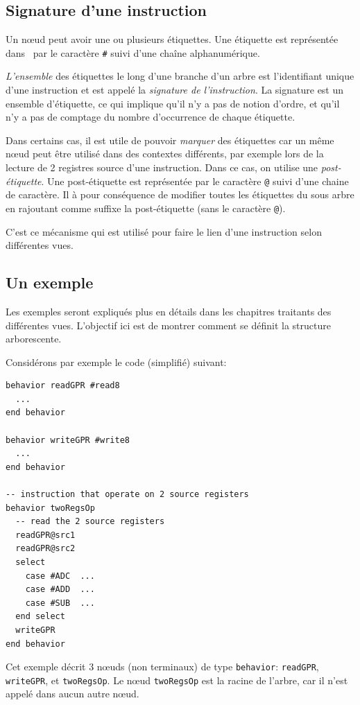 \subsection{Signature d'une instruction}
\label{sec:signature}
Un n\oe ud peut avoir une ou plusieurs étiquettes. Une étiquette est représentée dans \harmless\ par le caractère \texttt{\#} suivi d'une chaîne alphanumérique. 

\emph{L'ensemble} des étiquettes le long d'une branche d'un arbre est l'identifiant unique d'une instruction et est appelé la \emph{signature de l'instruction}. La signature est un ensemble d'étiquette, ce qui implique qu'il n'y a pas de notion d'ordre, et qu'il n'y a pas de comptage du nombre d'occurrence de chaque étiquette.

Dans certains cas, il est utile de pouvoir \emph{marquer} des étiquettes car un même n\oe ud peut être utilisé dans des contextes différents, par exemple lors de la lecture de 2 registres source d'une instruction. Dans ce cas, on utilise une \emph{post-étiquette}. Une post-étiquette est représentée par le caractère \texttt{@} suivi d'une chaine de caractère. Il à pour conséquence de modifier toutes les étiquettes du sous arbre en rajoutant comme suffixe la post-étiquette (sans le caractère \texttt{@}).

C'est ce mécanisme qui est utilisé pour faire le lien d'une instruction selon différentes vues.

\subsection{Un exemple}
\label{exempleSignature}
Les exemples seront expliqués plus en détails dans les chapitres traitants des différentes vues. L'objectif ici est de montrer comment se définit la structure arborescente.

Considérons par exemple le code (simplifié) suivant:
\begin{lstlisting}
behavior readGPR #read8
  ...
end behavior

behavior writeGPR #write8
  ...
end behavior

-- instruction that operate on 2 source registers
behavior twoRegsOp
  -- read the 2 source registers
  readGPR@src1
  readGPR@src2
  select
    case #ADC  ...
    case #ADD  ...
    case #SUB  ...
  end select
  writeGPR
end behavior

\end{lstlisting}
Cet exemple décrit 3 n\oe uds (non terminaux) de type \texttt{behavior}: \texttt{readGPR}, \texttt{writeGPR}, et \texttt{twoRegsOp}. Le n\oe ud \texttt{twoRegsOp} est la racine de l'arbre, car il n'est appelé dans aucun autre n\oe ud. 

